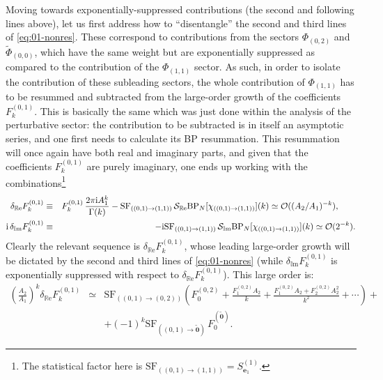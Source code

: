 \documentclass[11pt,a4paper]{article}
\newcommand{\CO}{{\cal O}}
\newcommand{\CS}{{\cal S}}
\def\im{{\mathbb{I}}{\mathrm{m}}}
\def\re{{\mathbb{R}}{\mathrm{e}}}
\newcommand{\rmi}{{\mathrm{i}}}
\begin{document}
Moving towards exponentially-suppressed contributions (the second and following lines above), let us first address how to ``disentangle'' the second and third lines of \eqref{eq:01-nonres}. These correspond to contributions from the sectors $\Phi_{(0,2)}$ and $\widetilde{\Phi}_{(0,0)}$, which have the same weight but are exponentially suppressed as compared to the contribution of the $\Phi_{(1,1)}$ sector. As such, in order to isolate the contribution of these subleading sectors, the whole contribution of $\Phi_{(1,1)}$ has to be resummed and subtracted from the large-order growth of the coefficients $F^{(0,1)}_k$. This is basically the same which was just done within the analysis of the perturbative sector: the contribution to be subtracted is in itself an asymptotic series, and one first needs to calculate its BP resummation. This resummation will once again have both real and imaginary parts, and given that the coefficients $F^{(0,1)}_k$ are purely imaginary, one ends up working with the combinations\footnote{The statistical factor here is $\mathrm{SF}_{( (0,1) \rightarrow (1,1)) } = S_{\boldsymbol{e}_1}^{(1)}$.}
%
\begin{eqnarray}
\label{eq:01-subleading-def}
\delta_{\re} F^{(0,1)}_k &\equiv& F_k^{(0,1)}\, \frac{2\pi\rmi A_1^k}{\Gamma(k)} - \mathrm{SF}_{( (0,1) \rightarrow (1,1) )}\, \CS_{\re} \mathrm{BP}_{N} [\chi_{( (0,1) \rightarrow (1,1) )}] (k) \simeq \CO ( (A_2/A_1)^{-k} ), \qquad \\
\label{eq:01-subleading-def-IM}
\mathrm{i}\, \delta_{\im} F^{(0,1)}_k &\equiv& - \rmi \mathrm{SF}_{( (0,1) \rightarrow (1,1) )}\, \CS_{\im} \mathrm{BP}_{N} [\chi_{( (0,1) \rightarrow (1,1) )}] (k) \simeq \CO (2^{-k}).
\end{eqnarray}
%
\noindent
Clearly the relevant sequence is $\delta_{\re} F^{(0,1)}_k$, whose leading large-order growth will be dictated by the second and third lines of \eqref{eq:01-nonres} (while $\delta_{\im} F^{(0,1)}_k$ is exponentially suppressed with respect to $\delta_{\re} F^{(0,1)}_k$). This large order is:
%
\begin{eqnarray}
\left( \frac{A_2}{A_1} \right)^k \delta_{\re} F^{(0,1)}_k &\simeq& \mathrm{SF}_{( (0,1) \rightarrow (0,2) )} \left( F^{(0,2)}_0 + \frac{F^{(0,2)}_1 A_2}{k} + \frac{F^{(0,2)}_1 A_2 + F^{(0,2)}_2 A_2^2}{k^2} + \cdots \right) + \nonumber \\
&&
+ \left(-1\right)^k \mathrm{SF}_{( (0,1) \rightarrow \widetilde{\boldsymbol{0}} )}\, F_0^{(\widetilde{\boldsymbol{0}})}.
\label{eq:01-subleading}
\end{eqnarray} 
\end{document}
